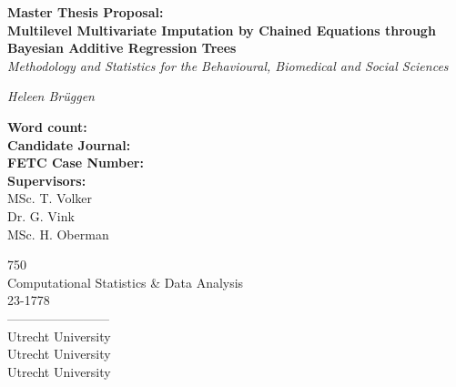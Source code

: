 \documentclass[10pt, a4paper, titlepage]{article}
\begin{document}
\begin{titlingpage}
\begin{center}
\Huge\textbf{Master Thesis Proposal:  \\ Multilevel Multivariate Imputation by Chained Equations through Bayesian Additive Regression Trees} \\
\Large\textit{Methodology and Statistics for the Behavioural, Biomedical and Social Sciences}

\vspace{.5cm}

\normalsize\textit{Heleen Brüggen}

\vspace{15cm}

\begin{minipage}{0.5\textwidth}
\begin{flushleft}

\textbf{Word count:} \\
\textbf{Candidate Journal:} \\
\textbf{FETC Case Number:} \\
\textbf{Supervisors:} \\
MSc. T. Volker \\
Dr. G. Vink \\
 MSc. H. Oberman
\end{flushleft}
\end{minipage}%
\begin{minipage}{0.5\textwidth}
\begin{flushright}

750 \\ 
Computational Statistics \& Data Analysis \\
23-1778 \\
------------------------\\
Utrecht University \\
Utrecht University \\
Utrecht University
\end{flushright}
\end{minipage}

\end{center}
\end{titlingpage}

\newpage
\end{document}

